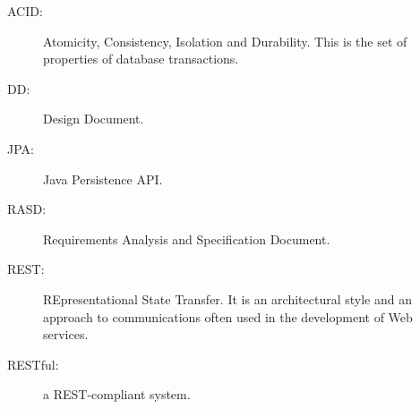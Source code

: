 \begin{description}
\item[ACID:] Atomicity, Consistency, Isolation and Durability. This is the set of properties of database transactions. 
\item[DD:] Design Document.
\item[JPA:] Java Persistence API.
\item[RASD:] Requirements Analysis and Specification Document.
\item[REST:] REpresentational State Transfer. It is an architectural style and an approach to communications often used in the development of Web services.
\item[RESTful:] a REST-compliant system.
\end{description}